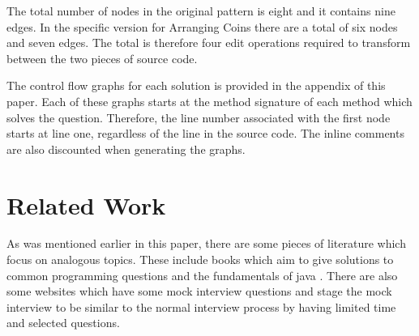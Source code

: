 \documentclass[10pt,twocolumn,hidelinks]{IEEEtran}
\begin{document}
\par The total number of nodes in the original pattern is eight and it contains nine edges. In the specific version for Arranging Coins there are a total of six nodes and seven edges. The total is therefore four edit operations required to transform between the two pieces of source code. 
\par The control flow graphs for each solution is provided in the appendix of this paper. Each of these graphs starts at the method signature of each method which solves the question. Therefore, the line number associated with the first node starts at line one, regardless of the line in the source code. The inline comments are also discounted when generating the graphs.
\section{Related Work}
As was mentioned earlier in this paper, there are some pieces of literature which focus on analogous topics. These include books which aim to give solutions to common programming questions \cite{mcdowell2015cracking} and the fundamentals of java \cite{markham2014java}\cite{aziz2012elements}. There are also some websites which have some mock interview questions and stage the mock interview to be similar to the normal interview process by having limited time and selected questions.
\end{document}
